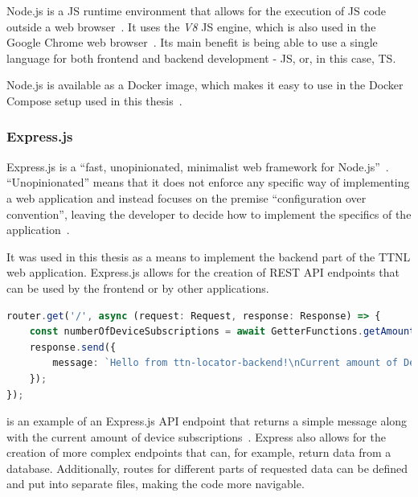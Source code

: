 Node.js is a \ac{JS} runtime environment that allows for the execution of \ac{JS} code outside a web browser~\cite{noauthor_nodejs_nodate}.
It uses the \emph{V8} \ac{JS} engine, which is also used in the Google Chrome web browser~\cite{noauthor_v8_nodate}.
Its main benefit is being able to use a single language for both frontend and backend development - \ac{JS}, or, in this case, \ac{TS}.

Node.js is available as a Docker image, which makes it easy to use in the Docker Compose setup used in this thesis~\cite{docker_inc_node_2023}.

\subsubsection{Express.js}

Express.js is a ``fast, unopinionated, minimalist web framework for Node.js''~\cite{noauthor_express_nodate}.
``Unopinionated'' means that it does not enforce any specific way of implementing a web application and instead focuses on the premise ``configuration over convention'', leaving the developer to decide how to implement the specifics of the application~\cite{mardan_pro_2014}.

It was used in this thesis as a means to implement the backend part of the \ac{TTNL} web application.
Express.js allows for the creation of \ac{REST} \ac{API} endpoints that can be used by the frontend or by other applications.

\begin{lstlisting}[language=TypeScript, float, caption={Example of an Express.js \ac{API} endpoint}, label={lst:express-api-endpoint}]
router.get('/', async (request: Request, response: Response) => {
    const numberOfDeviceSubscriptions = await GetterFunctions.getAmountOfDeviceSubscriptions();
    response.send({
        message: `Hello from ttn-locator-backend!\nCurrent amount of Device subscriptions: ${numberOfDeviceSubscriptions}`,
    });
});
\end{lstlisting}

 is an example of an Express.js \ac{API} endpoint that returns a simple message along with the current amount of device subscriptions~\cite{noauthor_express_nodate-1}.
Express also allows for the creation of more complex endpoints that can, for example, return data from a database.
Additionally, routes for different parts of requested data can be defined and put into separate files, making the code more navigable.


